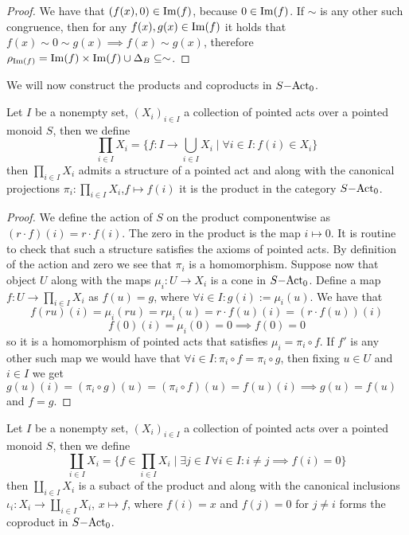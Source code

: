 \begin{proof}
    We have that $(f(x),0)\in\mathrm{Im}(f)$, because $0\in\mathrm{Im}(f)$. If $\sim$ is any other such congruence, then for any $f(x),g(x)\in\mathrm{Im}(f)$
    it holds that $f(x)\sim 0 \sim g(x) \implies f(x)\sim g(x)$, therefore $\rho_{\mathrm{Im}(f)}=\mathrm{Im}(f)\times\mathrm{Im}(f)\cup\Delta_B\subseteq\sim$.
\end{proof}
We will now construct the products and coproducts in $S\mathrm{-Act}_0$. 
\begin{proposition}
    Let $I$ be a nonempty set, $(X_i)_{i\in I}$ a collection of pointed acts over a pointed monoid $S$, then we define 
    \[
        \prod_{i\in I}X_i = \{f: I \to\bigcup_{i\in I } X_i \mid\forall i\in I :  f(i)\in X_i \}
    \]
    then $\prod_{i\in I}X_i$ admits a structure of a pointed act and along with the canonical projections 
    $\pi_i : \prod_{i\in I }X_i$,$f\mapsto f(i)$ it is the product in the category $S\mathrm{-Act}_0$.
\end{proposition}
\begin{proof}
    We define the action of $S$ on the product componentwise as $(r\cdot f)(i) = r\cdot f(i)$. The zero in the product 
    is the map $i\mapsto 0$. It is routine to check that such a structure satisfies the 
    axioms of pointed acts. By definition of the action and zero we see that $\pi_i$ is a homomorphism. Suppose now that 
    object $U$ along with the maps $\mu_i : U \to X_i$ is a cone in $S\mathrm{-Act}_0$. Define a map $f: U \to\prod_{i\in I} X_i$ 
    as $f(u) = g$, where $\forall i\in I : g(i) := \mu_i(u)$. We have that 
    \[
        f(ru)(i) = \mu_i(ru) = r\mu_i(u) = r\cdot f(u)(i) = (r\cdot f(u))(i)
    \]  
    \[
        f(0)(i) = \mu_i(0) = 0 \implies f(0) = 0
    \]
    so it is a homomorphism of pointed acts that satisfies $\mu_i = \pi_i\circ f$. If $f'$ is any other such map we would have that 
    $\forall i\in I : \pi_i\circ f = \pi_i\circ g$, then fixing $u\in U$ and $i\in I$ we get $g(u)(i) = (\pi_i \circ g)(u) = (\pi_i\circ f)(u) = f(u)(i) \implies g(u)=f(u)$ 
    and $f=g$.
\end{proof}
\begin{proposition}
    Let $I$ be a nonempty set, $(X_i)_{i\in I}$ a collection of pointed acts over a pointed monoid $S$, then we define 
    \[
        \coprod_{i\in I } X_i = \{f\in\prod_{i\in I }X_i \mid \exists j\in I\,\forall i\in I : i\neq j \implies f(i) = 0\}
    \]
    then $\coprod_{i\in I} X_i$ is a subact of the product and along with the canonical inclusions $\iota_i : X_i \to \coprod_{i\in I} X_i$, $x\mapsto f$, where 
    $f(i) = x$ and $f(j)=0$ for $j\neq i$
    forms the coproduct in $S\mathrm{-Act}_0$.
\end{proposition}

